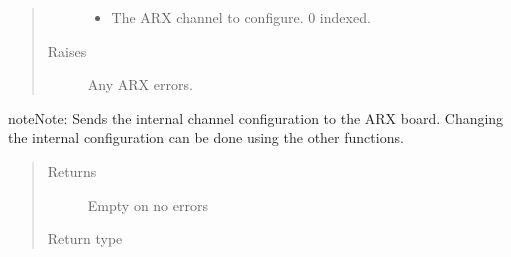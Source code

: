 \documentclass[letterpaper,10pt,english]{sphinxmanual}
\begin{document}
\begin{fulllineitems}
\begin{fulllineitems}
\begin{quote}
\begin{description}
\begin{itemize}
\item {} 
 \textendash{} The ARX channel to configure. 0 indexed.

\end{itemize}

\item[{Raises}] \leavevmode
{} \textendash{} Any ARX errors.

\end{description}\end{quote}

\begin{sphinxadmonition}{note}{Note:}
Sends the internal channel configuration to the ARX board.
Changing the internal configuration can be done using the other
 functions.
\end{sphinxadmonition}
\begin{quote}\begin{description}
\item[{Returns}] \leavevmode
Empty on no errors

\item[{Return type}] \leavevmode
{}

\end{description}\end{quote}





\end{fulllineitems}
\end{fulllineitems}
\end{document}
